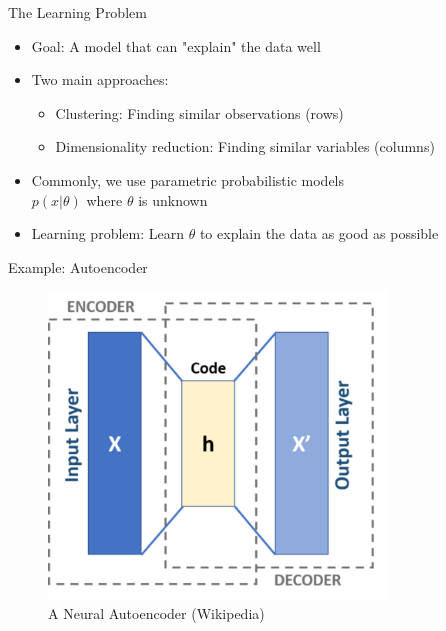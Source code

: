 \documentclass[10pt]{beamer}
\begin{document}
\begin{frame}{The Learning Problem}

\begin{itemize}
\item {\color{uured} Goal}: A model that can "explain" the data well
\item Two main approaches:
\begin{itemize}
\item {\color{uured} Clustering}: Finding similar {\color{uured} observations} (rows)
\item {\color{uured} Dimensionality reduction}: Finding similar {\color{uured} variables} (columns)
\end{itemize}
\pause
\item Commonly, we use parametric probabilistic models\\ $p(x|\theta)$ where $\theta$ is unknown
\item {\color{uured} Learning problem}: Learn $\theta$ to explain the data as good as possible
\end{itemize}

\end{frame}


\begin{frame}{Example: Autoencoder}

\begin{figure}[h]
\centering
\includegraphics[width=0.8\textwidth]{fig/440px-Autoencoder_schema.png}
\caption{A Neural Autoencoder (Wikipedia)}
\end{figure}

\end{frame}
\end{document}
